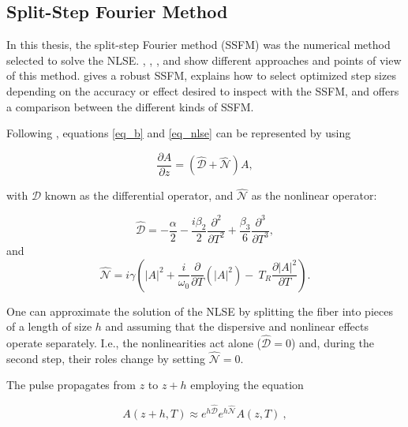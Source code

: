     \subsection{Split-Step Fourier Method}

        In this thesis, the split-step Fourier method (SSFM) was the numerical method selected to solve the NLSE. \citep{AgrawalBook}, \citep{sinkin}, \citep{robust},  and \citep{HohageSchmidt2002} show different approaches and points of view of this method.  \citep{robust} gives a robust SSFM,  \citep{sinkin} explains how to select optimized step sizes depending on the accuracy or effect desired to inspect with the SSFM, and  \citep{HohageSchmidt2002} offers a comparison between the different kinds of SSFM. 
        
        Following \citep{AgrawalBook}, equations \eqref{eq_b} and \eqref{eq_nlse} can be represented by using
    
        \begin{equation}\label{eq_dpn}
            \frac{\partial A}{\partial z} = \left( \hat{\mathcal{D}} + \hat{\mathcal{N}} \right) A, 
        \end{equation}
        
        with $\hat{\mathcal{D}}$ known as the differential operator, and $\hat{\mathcal{N}}$ as the nonlinear operator: 
        
        \begin{equation}
            \hat{\mathcal{D}} = -\frac{\alpha}{2} - \frac{i \beta_2}{2} \frac{\partial^2 }{\partial T^2} +\frac{\beta_3}{6} \frac{\partial^3 }{\partial T^3},
        \end{equation}
        and
        \begin{equation}
             \hat{\mathcal{N}} = i \gamma   \left(\left|A\right|^2+ \frac{i}{\omega_0} \frac{\partial}{\partial T} (\left| A\right|^2)-  \ T_R \frac{\partial \left|A \right|^2}{\partial T} \right).
        \end{equation}
        
        One can approximate the solution of the NLSE by splitting the fiber into pieces of a length of size $h$ and assuming that the dispersive and nonlinear effects operate separately. I.e., the nonlinearities act alone ($\hat{\mathcal{D}} = 0$) and, during the second step, their roles change by setting $\hat{\mathcal{N}} = 0$.

        The pulse propagates from $z$ to $z+h$ employing the equation 
        
        \begin{equation}\label{eq_azh}
            A(z+h, T) \approx e^{h\hat{\mathcal{D}}} e^{h\hat{\mathcal{N}}} A(z,T) \ ,
        \end{equation}
        
